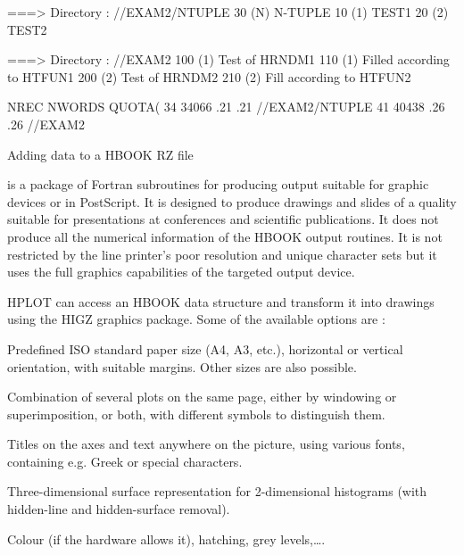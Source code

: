 \begin{Fighere}
\begin{XMP}
 
===> Directory : //EXAM2/NTUPLE
        30 (N)   N-TUPLE
        10 (1)   TEST1
        20 (2)   TEST2
 
===> Directory : //EXAM2
       100 (1)   Test of HRNDM1
       110 (1)   Filled according to HTFUN1
       200 (2)   Test of HRNDM2
       210 (2)   Fill according to HTFUN2
 
 
      NREC    NWORDS    QUOTA(%
       34      34066       .21      .21   //EXAM2/NTUPLE
       41      40438       .26      .26   //EXAM2
 
\end{XMP}
\caption{Adding data to a HBOOK RZ file}
\label{FEX2IN}
\end{Fighere}

\newpage%

\label{HPLOTINT}

\HPLOT{} is a package of Fortran subroutines for producing
\HBOOK{} output suitable for graphic devices or in PostScript.
It is designed to produce drawings
and slides of a quality suitable for presentations
at conferences and scientific publications.
It does not produce all the numerical information of the
HBOOK output routines.
It is not restricted by the line printer's
poor resolution and unique character sets but it uses the 
full graphics capabilities of the targeted output device.
      
HPLOT can access an HBOOK data structure and transform it
into drawings using the HIGZ graphics package.
Some of the available options are :
\begin{UL}
\item Predefined ISO standard paper size (A4, A3, etc.), horizontal or
      vertical orientation, with suitable margins.
      Other sizes are also possible.
\item Combination of several plots on the same page, either by
      windowing or superimposition, or both, with different symbols
      to distinguish them.
\item Titles on the axes and text anywhere on the picture,
      using various fonts, containing e.g. Greek or special characters.
\item Three-dimensional surface representation
      for 2-dimensional histograms (with
      hidden-line and hidden-surface removal).
\item Colour (if the hardware allows it), hatching, grey levels,\ldots.
\end{UL}

